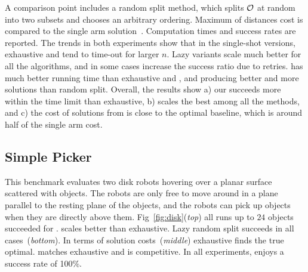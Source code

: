 A comparison point includes a random split method, which splits $ \mathcal{O} $ at random into two subsets and chooses an arbitrary ordering. Maximum of distances cost is compared to the single arm solution~\cite{193}. Computation times and success rates are reported. The trends in both experiments show that in the single-shot versions, exhaustive and \milp tend to time-out for larger $n$. Lazy variants scale much better for all the algorithms, and in some cases increase the success ratio due to retries. \algo has much better running time than exhaustive and \milp, and producing better and more solutions than random split. Overall, the results show a) our \milp succeeds more within the time limit than exhaustive, b) \algo scales the best among all the methods, and c) the cost of solutions from \algo is close to the optimal baseline, which is around half of the single arm cost.

\subsection{Simple Picker}
This benchmark evaluates two disk robots hovering over a planar surface scattered with objects. The robots are only free to move around in a plane parallel to the resting plane of the objects, and the robots can pick up objects when they are directly above them. Fig~\ref{fig:disk}(\textit{top}) all runs up to $ 24 $ objects succeeded for \algo. \milp scales better than exhaustive. Lazy random split succeeds in all cases~(\textit{bottom}). In terms of solution costs~(\textit{middle}) exhaustive finds the true optimal. \milp matches exhaustive and \algo is competitive. In all experiments, \algo enjoys a success rate of 100\%.

